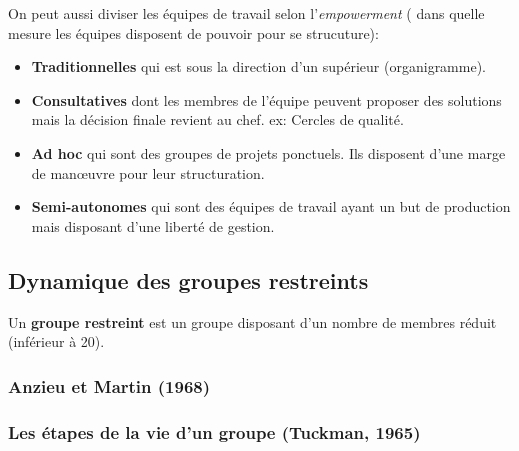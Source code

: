 \documentclass[12pt]{article}
\begin{document}
		On peut aussi diviser les équipes de travail selon l'\textit{empowerment} ( dans quelle mesure les équipes disposent de pouvoir pour se strucuture):
		\begin{itemize}
		\item \textbf{Traditionnelles} qui est sous la direction d'un supérieur (organigramme).
		\item \textbf{Consultatives} dont les membres de l'équipe peuvent proposer des solutions mais la décision finale revient au chef. \newline
		ex: Cercles de qualité.
		\item \textbf{Ad hoc} qui sont des groupes de projets ponctuels. Ils disposent d'une marge de man\oe uvre pour leur structuration.
		\item \textbf{Semi-autonomes} qui sont des équipes de travail ayant un but de production mais disposant d'une liberté de gestion. 
		\end{itemize}
		
		
	\subsection{Dynamique des groupes restreints}
	
	Un \textbf{groupe restreint} est un groupe disposant d'un nombre de membres réduit (inférieur à 20).
	
		\subsubsection{Anzieu et Martin (1968)}
	
			
		
		\subsubsection{Les étapes de la vie d’un groupe (Tuckman, 1965)}
		
\end{document}
